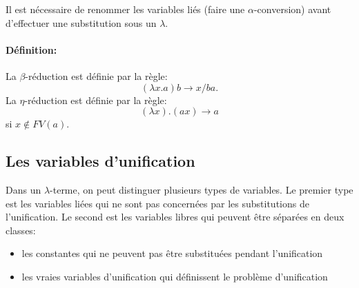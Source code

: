 Il est nécessaire de renommer les variables liés (faire une $\alpha$-conversion) avant d’effectuer une substitution sous un $\lambda$. 

\paragraph{Définition:}
La $\beta$-réduction est définie par la règle:
\[(\lambda x.a)b \xrightarrow{} {x/b}a.\]
La $\eta$-réduction est définie par la règle:
\[(\lambda x).(a x) \xrightarrow{} a \]
si $x \notin FV(a)$.

\subsection{Les variables d’unification}

Dans un $\lambda$-terme, on peut distinguer plusieurs types de variables. Le premier type est les variables liées qui ne sont pas concernées par les substitutions de l’unification. Le second est les variables libres qui peuvent être séparées en deux classes:
\begin{itemize}
    \item les constantes qui ne peuvent pas être substituées pendant l’unification
    \item les vraies variables d’unification qui définissent le problème d’unification
\end{itemize}